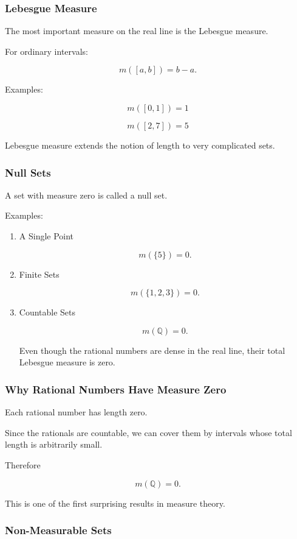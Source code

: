 \documentclass[11pt]{article}
\begin{document}
\subsubsection{Lebesgue Measure}
\label{sec:orge36493e}

The most important measure on the real line is the Lebesgue measure.

For ordinary intervals:

\[
m([a,b])=b-a.
\]

Examples:

\[
m([0,1])=1
\]

\[
m([2,7])=5
\]

Lebesgue measure extends the notion of length to very complicated sets.
\subsubsection{Null Sets}
\label{sec:orgee51c95}

A set with measure zero is called a null set.

Examples:
\begin{enumerate}
\item A Single Point
\label{sec:org910327a}

\[
m(\{5\})=0.
\]
\item Finite Sets
\label{sec:orgdf20a4d}

\[
m(\{1,2,3\})=0.
\]
\item Countable Sets
\label{sec:orge0d7468}

\[
m(\mathbb Q)=0.
\]

Even though the rational numbers are dense in the real line, their total
Lebesgue measure is zero.
\end{enumerate}
\subsubsection{Why Rational Numbers Have Measure Zero}
\label{sec:orge6d463a}

Each rational number has length zero.

Since the rationals are countable, we can cover them by intervals whose total
length is arbitrarily small.

Therefore

\[
m(\mathbb Q)=0.
\]

This is one of the first surprising results in measure theory.
\subsubsection{Non-Measurable Sets}
\label{sec:org6fc22ba}
\end{document}

